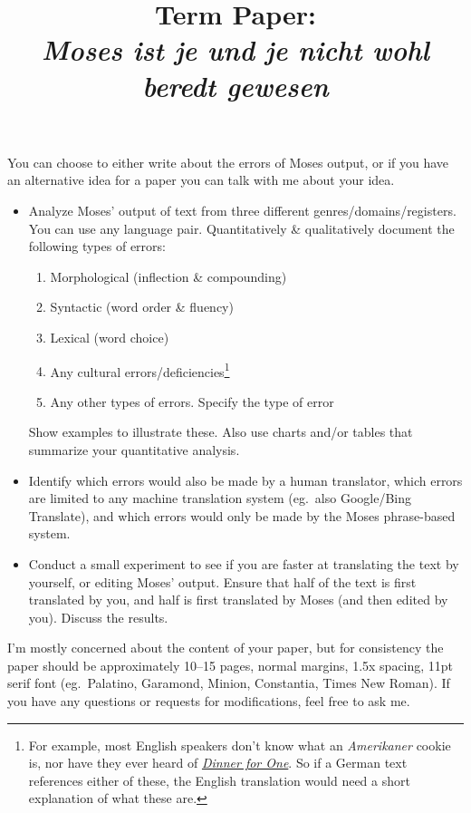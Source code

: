 \documentclass[11pt]{article}
\title{Term Paper: \\[1.0em] \Large{\textit{Moses ist je und je nicht wohl beredt gewesen}}}
\begin{document}
\maketitle


\begin{spacing}{1.35}

You can choose to either write about the errors of Moses output, or if you have an alternative idea for a paper you can talk with me about your idea.

\begin{itemize}
\item Analyze Moses' output of text from three different genres/domains/registers.
	You can use any language pair.
	Quantitatively \& qualitatively document the following types of errors:
 \begin{spacing}{0.9}
 \begin{enumerate}
  \item Morphological (inflection \& compounding)
  \item Syntactic (word order \& fluency)
  \item Lexical (word choice)
  \item Any cultural errors/deficiencies\footnote{For example, most English speakers don't know what an \textit{Amerikaner} cookie is, nor have they ever heard of \href{https://en.wikipedia.org/wiki/Dinner_for_One}{\textit{Dinner for One}}.  So if a German text references either of these, the English translation would need a short explanation of what these are.}
  \item Any other types of errors.  Specify the type of error
 \end{enumerate}
 \end{spacing}

 Show examples to illustrate these.
 Also use charts and/or tables that summarize your quantitative analysis.

\item Identify which errors would also be made by a human translator, which errors are limited to any machine translation system (eg.\ also Google/Bing Translate), and which errors would only be made by the Moses phrase-based system.

\item Conduct a small experiment to see if you are faster at translating the text by yourself, or editing Moses' output.
	Ensure that half of the text is first translated by you, and half is first translated by Moses (and then edited by you).
	Discuss the results.

\end{itemize}

I'm mostly concerned about the content of your paper, but for consistency the paper should be approximately 10--15 pages, normal margins, 1.5x spacing, 11pt serif font (eg.~Palatino, Garamond, Minion, Constantia, Times New Roman).
If you have any questions or requests for modifications, feel free to ask me.


\end{spacing}
%
\end{document}
